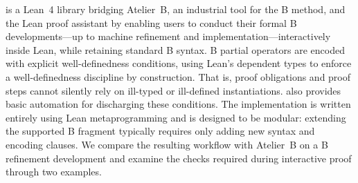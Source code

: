 \barrel is a Lean~4 library bridging Atelier~B, an industrial tool for the B method, and the Lean proof assistant by enabling users to conduct their formal B developments---up to machine refinement and implementation---interactively inside Lean, while retaining standard B syntax.
B partial operators are encoded with explicit well-definedness conditions, using Lean's dependent types to enforce a well-definedness discipline by construction.
That is, proof obligations and proof steps cannot silently rely on ill-typed or ill-defined instantiations.
\barrel also provides basic automation for discharging these conditions.
The implementation is written entirely using Lean metaprogramming and is designed to be modular: extending the supported B fragment typically requires only adding new syntax and encoding clauses.
We compare the resulting workflow with Atelier~B on a B refinement development and examine the checks required during interactive proof through two examples.
